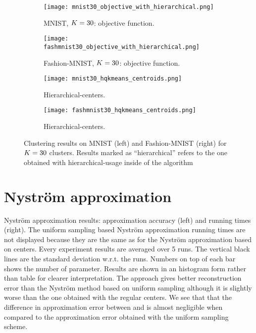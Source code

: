\begin{figure}[h]
\begin{subfigure}{.49\textwidth}
\texttt{[image: mnist30\_objective\_with\_hierarchical.png]}
\caption{MNIST, $K=30$: objective function.}
\label{fig:mnist:objfunhier}
\end{subfigure}
\begin{subfigure}{.49\textwidth}
\texttt{[image: fashmnist30\_objective\_with\_hierarchical.png]}
\caption{Fashion-MNIST, $K=30$: objective function.}
\label{fig:fmnist:objfunhier}
\end{subfigure}
\begin{subfigure}{.49\textwidth}
\texttt{[image: mnist30\_hqkmeans\_centroids.png]}
\caption{Hierarchical-\palm \qkmeans centers.}
\label{fig:mnist:hqkmeans:centers}
\end{subfigure}
\begin{subfigure}{.49\textwidth}
\texttt{[image: fashmnist30\_hqkmeans\_centroids.png]}
\caption{Hierarchical-\palm \qkmeans centers.}
\label{fig:fmnist:hqkmeans:centers}
\end{subfigure}
\caption{Clustering results on MNIST (left) and Fashion-MNIST (right) for $K=30$ clusters. Results marked as ``hierarchical'' refers to the one obtained with hierarchical-\palm usage inside of the  \qkmeans algorithm}
\label{fig:hierarchical_objective}

\end{figure}

\FloatBarrier

\section{Nyström approximation}
\label{supp:nystrom}

Nystr\"om approximation results: approximation accuracy (left) and running times (right). The uniform sampling based Nyström approximation running times are not displayed because they are the same as for the Nyström approximation based on \kmeans centers. Every experiment results are averaged over 5 runs. The vertical black lines are the standard deviation w.r.t. the runs. Numbers on top of each bar shows the number of parameter.
Results are shown in an histogram form rather than table for clearer interpretation. The \qkmeans approach gives better reconstruction error than the Nyström method based on uniform sampling although it is slightly worse than the one obtained with the regular \kmeans centers. We see that that the difference in approximation error between \kmeans and \qkmeans is almost negligible when compared to the approximation error obtained with the uniform sampling scheme.


